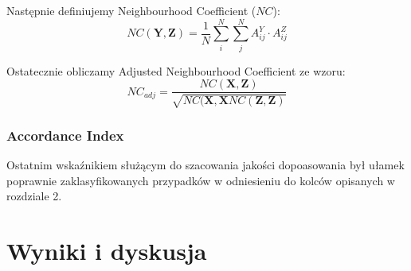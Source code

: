 \documentclass{article}
\begin{document}
Następnie definiujemy Neighbourhood Coefficient ($NC$):
$$NC(\textbf{Y}, \textbf{Z}) = \frac{1}{N}\sum_i^N\sum_j^N A^Y_{ij} \cdot A^Z_{ij}$$

Ostatecznie obliczamy Adjusted Neighbourhood Coefficient ze wzoru:
$$NC_{adj} = \frac{NC(\textbf{X},\textbf{Z})}{\sqrt{NC(\textbf{X},\textbf{X}NC(\textbf{Z},\textbf{Z})}}$$
\subsubsection{Accordance Index}
Ostatnim wskaźnikiem służącym do szacowania jakości dopoasowania był ułamek poprawnie zaklasyfikowanych przypadków w odniesieniu do kolców opisanych w rozdziale 2.
\section{Wyniki i dyskusja}




\end{document}
